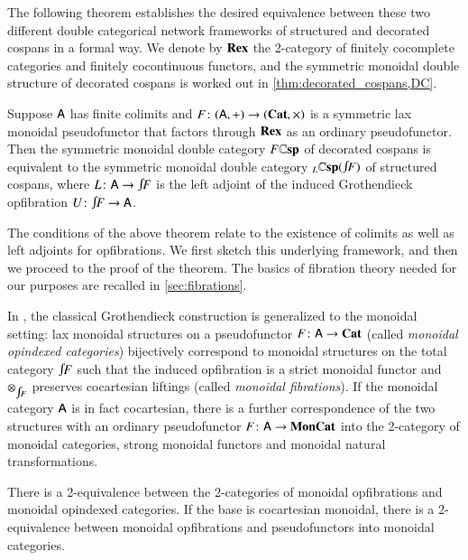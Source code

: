 \documentclass[reqno]{amsart}
\begin{document}
The following theorem establishes the desired equivalence between these two different double categorical network frameworks of structured and decorated cospans in a formal way. We denote by $\mathbf{Rex}$ the 2-category of finitely cocomplete categories and finitely cocontinuous functors, and the symmetric monoidal double structure of decorated cospans is worked out in \cref{thm:decorated_cospans,DC}.

\begin{thm} \label{thm:equiv}
Suppose $\mathsf{A}$ has finite colimits and $F \colon(\mathsf{A},+) \to (\mathbf{Cat},\times)$ is a symmetric lax monoidal pseudofunctor that factors through $\mathbf{Rex}$ as an ordinary pseudofunctor.   Then the symmetric monoidal double category $F\mathbf{\mathbb Csp}$ of decorated cospans is equivalent to the symmetric monoidal double category $_L\lCsp(\inta F)$ of structured cospans, where $L \maps \A \to \inta F$ is the left adjoint of the induced Grothendieck opfibration $U \maps \inta F \to \A$.
\end{thm}

The conditions of the above theorem relate to the existence of colimits as well as left adjoints for opfibrations. We first sketch this underlying framework, and then we proceed to the proof of the theorem. The basics of fibration theory needed for our purposes are recalled in \cref{sec:fibrations}. 

In \cite{MV}, the classical Grothendieck construction is generalized to the monoidal setting: lax monoidal structures on a pseudofunctor $F\colon\mathsf{A}\to\mathbf{Cat}$ (called \emph{monoidal opindexed categories}) bijectively correspond to monoidal structures on the total category $\inta F$ such that the induced opfibration is a strict monoidal functor and $\otimes_{\inta F}$ preserves cocartesian liftings (called \emph{monoidal fibrations}). If the monoidal category $\mathsf{A}$ is in fact cocartesian, there is a further correspondence of the two structures with an ordinary pseudofunctor $F\colon\mathsf{A}\to\mathbf{MonCat}$ into the 2-category of monoidal categories, strong monoidal functors and monoidal natural transformations.

\begin{lem}\label{lem:MonGroth}
 There is a 2-equivalence between the 2-categories of monoidal opfibrations and monoidal opindexed categories. If the base is cocartesian monoidal, there is a 2-equivalence between monoidal opfibrations and pseudofunctors into monoidal categories. 
\end{lem}
\end{document}
